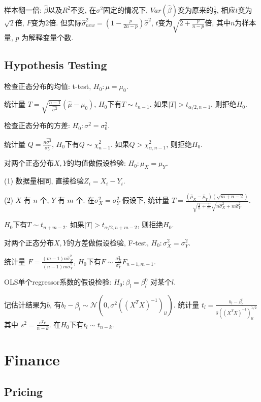 \documentclass[UTF8]{ctexart}
\begin{document}
样本翻一倍: $\hat{\beta}$以及$R^2$不变, 
在$\sigma^2$固定的情况下, $Var(\hat{\beta})$变为原来的$\frac{1}{2}$, 相应$t$变为$\sqrt{2}$倍, $F$变为2倍.
但实际$\hat{\sigma}_{new}^2 = (1-\frac{p}{2n-p})\hat{\sigma}^2$, $t$变为$\sqrt{2+\frac{p}{n-p}}$倍,
其中$n$为样本量, $p$ 为解释变量个数.

\subsection{Hypothesis Testing}

\noindent 检查正态分布的均值: t-test, $H_0: \mu=\mu_0$. \par
统计量 $T = \sqrt{\frac{n-1}{\hat{\sigma^2}}}(\hat{\mu}-\mu_0)$, $H_0$下有$T\sim t_{n-1}$.
如果$|T|>t_{\alpha/2,n-1}$, 则拒绝$H_0$.

\noindent 检查正态分布的方差: $H_0: \sigma^2=\sigma_0^2$.\par 
统计量 $Q = \frac{n \hat{\sigma^2}}{\sigma_0^2}$, $H_0$下有$Q\sim \chi^2_{n-1}$.
如果$Q> \chi^2_{\alpha,n-1}$, 则拒绝$H_0$.

\noindent 对两个正态分布$X, Y$的均值做假设检验: $H_0: \mu_X=\mu_Y$. \par 
(1) 数据量相同, 直接检验$Z_i=X_i-Y_i$. \par 
(2) $X$ 有 $n$ 个, $Y$ 有 $m$ 个.
在$\sigma_X^2 = \sigma_Y^2$ 假设下, 
统计量 $T = \frac{(\hat{\mu}_X-\hat{\mu}_Y)(\sqrt{m+n-2})}{\sqrt{\frac{1}{n}+\frac{1}{m}}\sqrt{n\hat{\sigma}_X^2+m\hat{\sigma}_Y^2}}$. \par 
$H_0$下有$T\sim t_{n+m-2}$.
如果$|T|>t_{\alpha/2,n+m-2}$, 则拒绝$H_0$.

\noindent 对两个正态分布$X, Y$的方差做假设检验, F-test, $H_0: \sigma_X^2=\sigma_Y^2$. \par 
统计量 $F = \frac{(m-1)n \hat{\sigma}_X^2}{(n-1)m \hat{\sigma}_Y^2}$,
$H_0$下有$F\sim \frac{\sigma_X^2}{\sigma_Y^2}F_{n-1,m-1}$.

\noindent OLS单个regressor系数的假设检验: $H_0: \beta_l=\beta_l^0$ 对某个$l$. \par
记估计结果为$b$, 有$b_l-\beta_l \sim \mathcal{N}(0,\sigma^2((X^TX)^{-1})_{ll})$.
统计量 $t_l = \frac{b_l-\beta_l^0}{\hat{s}((X^TX)^{-1})_{ll}^{1/2}}$ 其中 $s^2=\frac{e^Te}{n-k}$.
在$H_0$下有$t_l\sim t_{n-k}$.


\section{Finance}

\subsection{Pricing}
\end{document}
